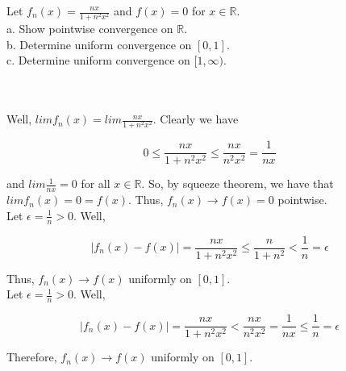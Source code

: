 Let $f_n(x)=\frac{nx}{1+n^2x^2}$ and $f(x)=0$ for $x\in\mathbb{R}$.\\

a. Show pointwise convergence on $\mathbb{R}$.\\

b. Determine uniform convergence on $[0,1]$.\\

c. Determine uniform convergence on $[1,\infty)$.\\\\

\begin{solution}\renewcommand{\qedsymbol}{}\ \\
    Well, $lim f_n(x)=lim \frac{nx}{1+n^2x^2}$. Clearly we have
    
    $$0\leq\frac{nx}{1+n^2x^2}\leq\frac{nx}{n^2x^2}=\frac{1}{nx}$$
    
    and $lim\frac{1}{nx}=0$ for all $x\in\mathbb{R}$. So, by squeeze theorem, we have that
    $lim f_n(x)=0=f(x)$. Thus, $f_n(x)\rightarrow f(x)=0$ pointwise.\\

    Let $\epsilon=\frac1n>0$. Well,
    
    $$|f_n(x)-f(x)|=\frac{nx}{1+n^2x^2}\leq\frac{n}{1+n^2}<\frac1n=\epsilon$$
    
    Thus, $f_n(x)\rightarrow f(x)$ uniformly on $[0,1]$.\\

    Let $\epsilon=\frac1n>0$. Well,
    
    $$|f_n(x)-f(x)|=\frac{nx}{1+n^2x^2}<\frac{nx}{n^2x^2}=\frac{1}{nx}\leq\frac1n=\epsilon$$
    
    Therefore, $f_n(x)\rightarrow f(x)$ uniformly on $[0,1]$.

\end{solution}